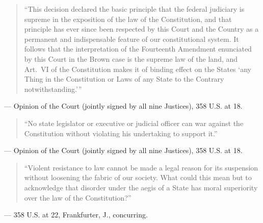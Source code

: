 \documentclass[12pt]{article}
\begin{document}
\begin{quote}
``This decision declared the basic principle that the federal judiciary is supreme in the exposition of the law of the Constitution, and that principle has ever since been respected by this Court and the Country as a permanent and indispensable feature of our constitutional system. It follows that the interpretation of the Fourteenth Amendment enunciated by this Court in the Brown case is the supreme law of the land, and Art.\ VI of the Constitution makes it of binding effect on the States `any Thing in the Constitution or Laws of any State to the Contrary notwithstanding.'''
\end{quote}
\noindent --- Opinion of the Court (jointly signed by all nine Justices), 358 U.S. at 18.

\begin{quote}
``No state legislator or executive or judicial officer can war against the Constitution without violating his undertaking to support it.''
\end{quote}
\noindent --- Opinion of the Court (jointly signed by all nine Justices), 358 U.S. at 18.

\begin{quote}
``Violent resistance to law cannot be made a legal reason for its suspension without loosening the fabric of our society. What could this mean but to acknowledge that disorder under the aegis of a State has moral superiority over the law of the Constitution?''
\end{quote}
\noindent --- 358 U.S. at 22, Frankfurter, J., concurring.
\end{document}
